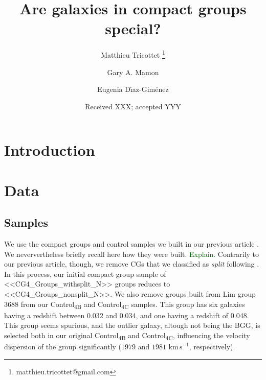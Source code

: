 \documentclass{aa}
\newcommand{\diazg}{D\'{\i}az-Gim\'enez}
\newcommand{\CB}{Control\textsubscript{4B}}
\newcommand{\CC}{Control\textsubscript{4C}}
\newcommand{\kms}{\,\mathrm{km\,s}^{-1}}
\newcommand{\mt}[1]{\textcolor{darkgreen}{#1}}
\begin{document}
\nolinenumbers
\title{Are galaxies in compact groups special?}

   \author{Matthieu Tricottet \thanks{matthieu.tricottet@gmail.com}
           \and Gary A. Mamon
           \and Eugenia \diazg{}}


   \date{Received XXX; accepted YYY}



   \maketitle

\section{Introduction}\label{sec:intro}

\section{Data}
\subsection{Samples}
We use the compact groups and control samples we built in our previous article \cite{Tricottet+25}. 
We neververtheless briefly recall here how they were built. \mt{Explain.} 
Contrarily to our previous article, though, we remove CGs that we classified as \emph{split} following \cite{Zheng&Shen21}.
In this process, our initial compact group sample of <<CG4_Groups_withsplit_N>> groups reduces to 
<<CG4_Groups_nonsplit_N>>. We also remove groups built from Lim group 3688 from our \CB{} and \CC{} samples. This group has six galaxies 
having a redshift between 0.032 and 0.034, and one having a redshift of 0.048. This group seems spurious, and the 
outlier galaxy, altough not being the BGG, is selected both in our original \CB{} and \CC{}, influencing the velocity 
dispersion of the group significantly ($1979$ and $1981\, \kms$, respectively).
\end{document}
